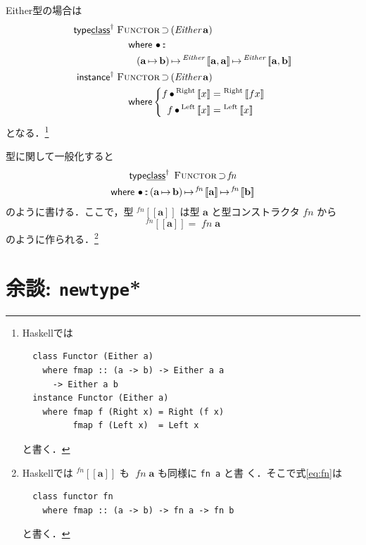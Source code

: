 \documentclass[a5paper,twoside,fleqn]{jsbook}
\def\[{\left[\!\left[}
\def\]{\right]\!\right]}
\newcommand{\programminglanguage}[1]{\textsf{#1}}
\newcommand{\haskell}{\programminglanguage{Haskell}}
\newcommand{\code}[1]{\texttt{#1}}
\newcommand{\mKeyword}[1]{\mathsf{#1}} %
\newcommand{\mKeywordUnderline}[1]{\text{\underline{\textsf{#1}}}} %
\newcommand{\mInstanceKeyword}{\mKeyword{instance}}
\newcommand{\mTypeClassKeyword}{\mKeyword{type}\mKeywordUnderline{class}}
\newcommand{\mWhereKeyword}{\mKeyword{where}}
\DeclareMathOperator{\mInstanceParametric}{\mInstanceKeyword^{\dagger}}
\DeclareMathOperator{\mSuperSet}{\supset}
\DeclareMathOperator{\mTypeClassParametric}{\mTypeClassKeyword^\dagger}
\DeclareMathOperator{\mWhere}{\mWhereKeyword}
\DeclareMathOperator{\mIn}{{:\!:}}
\DeclareMathOperator{\mMap}{\bullet}
\DeclareMathOperator{\mMapsTo}{\mapsto}
\newcommand{\mSpecialSub}[1]{\text{#1}}
\newcommand{\mLeft}{\mSpecialSub{Left}}
\newcommand{\mRight}{\mSpecialSub{Right}}
\newcommand{\mType}[1]{\mathbf{#1}}
\newcommand{\mGenericTypeAssemble}[2]{{}^{\mTypeConstructor{#1}}\[\mType{#2}\]}
\newcommand{\mGenericTypeAssembleII}[3]{{}^{\mTypeConstructor{#1}}\[\mType{#2},\mType{#3}\]}
\newcommand{\mEitherType}[2]{\mGenericTypeAssembleII{Either}{#1}{#2}}
\newcommand{\mTypeConstructor}[1]{\textit{#1}}
\DeclareMathOperator{\mEitherTypeConstructor}{\mTypeConstructor{Either}}
\newcommand{\mGenericValueConstructor}[1]{\mathrm{#1}}
\newcommand{\mGenericWith}[2]{{}^\mGenericValueConstructor{#1}\[#2\]}
\newcommand{\mLeftWith}[1]{\mGenericWith{\mLeft}{#1}}
\newcommand{\mRightWith}[1]{\mGenericWith{\mRight}{#1}}
\newcommand{\mGenericTypeClass}[1]{\textsc{#1}} %
\newcommand{\mFunctorTypeClass}{\mGenericTypeClass{Functor}}
\newcommand{\mProj}[2]{#1\mMapsTo#2}
\begin{document}
Either型の場合は
\begin{align}
\mTypeClassParametric\;
&\mFunctorTypeClass\mSuperSet{}(\mathop{\mEitherTypeConstructor}\mType{a})\nonumber\\
&\quad\mWhere{}
\mMap\mIn{}\nonumber\\
&\qquad\mProj{(\mProj{\mType{a}}{\mType{b}})}{\mProj{\mEitherType{a}{a}}{\mEitherType{a}{b}}}\\
\mInstanceParametric\;
&\mFunctorTypeClass\mSuperSet{}(\mathop{\mEitherTypeConstructor}\mType{a})\nonumber\\
&\quad\mWhere
\left\{
\begin{aligned}
f\mMap{}\mRightWith{x}&=\mRightWith{fx}\\
f\mMap{}\mLeftWith{x}&=\mLeftWith{x}
\end{aligned}
\right.
\end{align}
となる．\footnote{\haskell では
\begin{verbatim}
  class Functor (Either a)
    where fmap :: (a -> b) -> Either a a
      -> Either a b
  instance Functor (Either a)
    where fmap f (Right x) = Right (f x)
          fmap f (Left x)  = Left x
\end{verbatim}
と書く．}

型に関して一般化すると
\begin{multline}
\label{eq:fn}
\mTypeClassParametric\;\mFunctorTypeClass\mSuperSet\mTypeConstructor{fn}\\
\mWhere{}
\mMap\mIn{}\mProj{(\mProj{\mType{a}}{\mType{b}})}{\mProj{\mGenericTypeAssemble{fn}{a}}{\mGenericTypeAssemble{fn}{b}}}
\end{multline}
のように書ける．ここで，型 $\mGenericTypeAssemble{fn}{a}$ は型
$\mType{a}$ と型コンストラクタ $\mTypeConstructor{fn}$ から
\begin{equation}
\mGenericTypeAssemble{fn}{a}=\mathop{\mTypeConstructor{fn}}\mType{a}
\end{equation}
のように作られる．\footnote{\haskell では
$\mGenericTypeAssemble{fn}{a}$ も
$\mathop{\mTypeConstructor{fn}}\mType{a}$ も同様に \code{fn a} と書
く．そこで式\eqref{eq:fn}は
\begin{verbatim}
  class functor fn
    where fmap :: (a -> b) -> fn a -> fn b
\end{verbatim}
と書く．}

\section{余談: \code{newtype}*}
\end{document}
